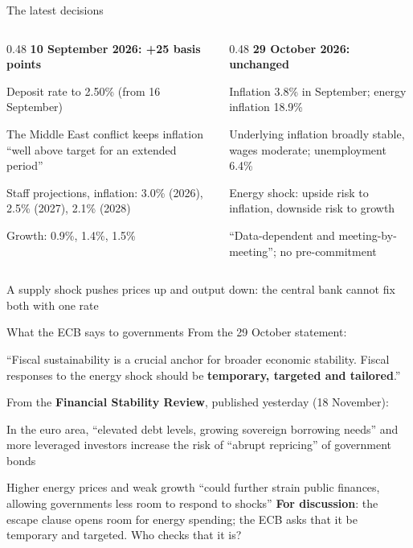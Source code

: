 \documentclass[aspectratio=169,xcolor=table]{beamer}
\begin{document}
\begin{frame}{The latest decisions}
\scriptsize
\begin{columns}[T]
\begin{column}{0.48\textwidth}
\textbf{10 September 2026: +25 basis points}
\bi
  \item Deposit rate to 2.50\% (from 16 September)
  \item The Middle East conflict keeps inflation ``well above target for an extended period''
  \item Staff projections, inflation: 3.0\% (2026), 2.5\% (2027), 2.1\% (2028)
  \item Growth: 0.9\%, 1.4\%, 1.5\%
\ei
\end{column}
\begin{column}{0.48\textwidth}
\textbf{29 October 2026: unchanged}
\bi
  \item Inflation 3.8\% in September; energy inflation 18.9\%
  \item Underlying inflation broadly stable, wages moderate; unemployment 6.4\%
  \item Energy shock: upside risk to inflation, downside risk to growth
  \item ``Data-dependent and meeting-by-meeting''; no pre-commitment
\ei
\end{column}
\end{columns}
\vspace{0.15cm}
\begin{block}{}
A supply shock pushes prices up and output down: the central bank cannot fix both with one rate
\end{block}
\end{frame}

\begin{frame}{What the ECB says to governments}
\footnotesize
From the 29 October statement:
\begin{block}{}
\footnotesize ``Fiscal sustainability is a crucial anchor for broader economic stability. Fiscal responses to the energy shock should be \textbf{temporary, targeted and tailored}.''
\end{block}
\vspace{0.1cm}
From the \textbf{Financial Stability Review}, published yesterday (18 November):
\bi
  \item In the euro area, ``elevated debt levels, growing sovereign borrowing needs'' and more leveraged investors increase the risk of ``abrupt repricing'' of government bonds
  \item Higher energy prices and weak growth ``could further strain public finances, allowing governments less room to respond to shocks''
\ei
\vspace{0.05cm}
\textbf{For discussion}: the escape clause opens room for energy spending; the ECB asks that it be temporary and targeted. Who checks that it is?
\end{frame}
\end{document}
